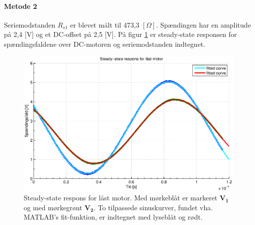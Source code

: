 \paragraph{Metode 2\\}
Seriemodstanden \(R_{s1}\) er blevet målt til 473,3 \([\Omega]\).
Spændingen har en amplitude på 2,4 [V] og et DC-offset på 2,5 [V].
På figur \ref{fig:induktans1} er steady-state responsen for spændingsfaldene over DC-motoren og seriemodstanden indtegnet.
\begin{figure}[th!]
	\centering
	\includegraphics[width=1\textwidth]{./graphics/induktans1.eps}
	\caption[Steady-state respons for låst motor]
		{Steady-state respons for låst motor. Med mørkeblåt er markeret \(\mathbf{V_1}\) og med mørkegrønt \(\mathbf{V_2}\).
		To tilpassede sinuskurver, fundet vha. MATLAB's fit-funktion, er indtegnet med lyseblåt og rødt.}
	\label{fig:induktans1}
\end{figure}

